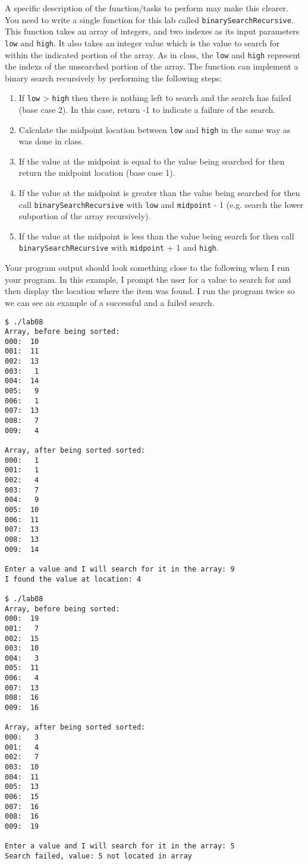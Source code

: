 \documentclass[11pt]{article}
\begin{document}
A specific description of the function/tasks to perform may make this
clearer.  You need to write a single function for this lab called
\verb~binarySearchRecursive~.  This function takes an array of integers,
and two indexes as its input parameters \verb~low~ and \verb~high~.  It also
takes an integer value which is the value to search for within the
indicated portion of the array.  As in class, the \verb~low~ and \verb~high~
represent the indexs of the unsearched portion of the array.  The
function can implement a binary search recursively by performing the
following steps:

\begin{enumerate}
\item If \verb~low~ > \verb~high~ then there is nothing left to search and the
   search has failed (base case 2).  In this case, return -1 to
   indicate a failure of the search.
\item Calculate the midpoint location between \verb~low~ and \verb~high~ in the
   same way as was done in class.
\item If the value at the midpoint is equal to the value being searched for
   then return the midpoint location (base case 1).
\item If the value at the midpoint is greater than the value being searched for
   then call \verb~binarySearchRecursive~ with \verb~low~ and \verb~midpoint~ - 1 (e.g. 
   search the lower subportion of the array recursively).
\item If the value at the midpoint is less than the value being search for 
   then call \verb~binarySearchRecursive~ with \verb~midpoint~ + 1 and \verb~high~.
\end{enumerate}

Your program output should look something close to the following when
I run your program.  In this example, I prompt the user for a value to
search for and then display the location where the item was found.  I
run the program twice so we can see an example of a successful and a
failed search.


\begin{verbatim}
$ ./lab08
Array, before being sorted:
000:  10
001:  11
002:  13
003:   1
004:  14
005:   9
006:   1
007:  13
008:   7
009:   4

Array, after being sorted sorted:
000:   1
001:   1
002:   4
003:   7
004:   9
005:  10
006:  11
007:  13
008:  13
009:  14

Enter a value and I will search for it in the array: 9
I found the value at location: 4

$ ./lab08
Array, before being sorted:
000:  19
001:   7
002:  15
003:  10
004:   3
005:  11
006:   4
007:  13
008:  16
009:  16

Array, after being sorted sorted:
000:   3
001:   4
002:   7
003:  10
004:  11
005:  13
006:  15
007:  16
008:  16
009:  19

Enter a value and I will search for it in the array: 5
Search failed, value: 5 not located in array
\end{verbatim}
\end{document}
